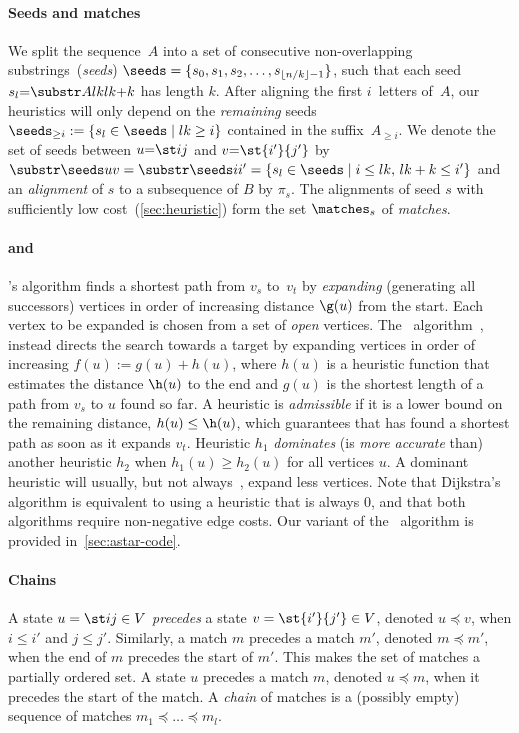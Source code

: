\paragraph{Seeds and matches}
We split the sequence~$A$ into a set of consecutive non-overlapping
substrings~(\emph{seeds}) $\seeds=\{s_0, s_1, s_2, \dots, s_{\lfloor n/k
\rfloor-1}\}$, such that each seed $s_l {=} \substr A{lk}{lk{+}k}$ has length
$k$. After aligning the first $i$~letters of~$A$, our heuristics will only
depend on the \emph{remaining} seeds ${\seeds_{\geq i} := \{s_l \in \seeds \mid
lk \geq i\}}$ contained in the suffix~$A_{\geq i}$. We denote the set of seeds
between $u{=}\st ij$ and $v{=}\st{i'}{j'}$ by $\substr \seeds uv = \substr
\seeds i{i'} = {\{s_l\in \seeds \mid i\leq lk, \, lk+k \leq i'\}}$ and an
\emph{alignment} of $s$ to a subsequence of $B$ by $\pi_s$. The alignments of
seed $s$ with sufficiently low cost~(\cref{sec:heuristic}) form the set
$\matches_s$ of \emph{matches}.

\paragraph{\dijkstra and \A}
\dijkstra's algorithm \citep{dijkstra1959note} finds a shortest path from $v_s$
to~$v_t$ by \emph{expanding} (generating all successors) vertices in order of
increasing distance $\g(u)$ from the start. Each vertex to be expanded is chosen
from a set of \emph{open} vertices. The
\A~algorithm~\citep{hart1968formal,pearl1984heuristics}, instead directs the
search towards a target by expanding vertices in order of increasing ${f(u) :=
g(u) + h(u)}$, where $h(u)$ is a heuristic function that estimates the distance
$\h(u)$ to the end and $g(u)$ is the shortest length of a path from $v_s$ to $u$
found so far. A heuristic is \emph{admissible} if it is a lower bound on the
remaining distance, $h(u) \leq \h(u)$, which guarantees that \A has found a
shortest path as soon as it expands $v_t$. Heuristic $h_1$ \emph{dominates} (is
\emph{more accurate} than) another heuristic $h_2$ when $h_1(u) \ge h_2(u)$ for
all vertices $u$. A dominant heuristic will usually, but not
always~\citep{holte2010common}, expand less vertices. Note that Dijkstra's
algorithm is equivalent to \A using a heuristic that is always $0$, and that
both algorithms require non-negative edge costs. Our variant of the \A~algorithm
is provided in~\cref{sec:astar-code}.

\paragraph{Chains}
A state $u=\st ij\in V$ \emph{precedes} a state $v=\st {i'}{j'}\in V$, denoted
$u\preceq v$, when $i\leq i'$ and $j\leq j'$. Similarly, a match $m$ precedes a
match $m'$, denoted $m\preceq m'$, when the end of $m$ precedes the start of
$m'$. This makes the set of matches a partially ordered set.
A state $u$ precedes a match $m$, denoted $u\preceq m$, when it precedes
the start of the match. A \emph{chain} of matches is a (possibly empty) sequence
of matches $m_1 \preceq \dots \preceq m_l$.

